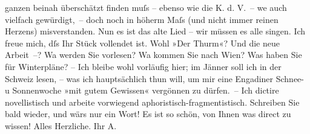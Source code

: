 \begin{ledgroupsized}[t]{13cm}
               ganzen beinah überschätzt finden muſs – ebenso wie die K. d. V. – we{\geminationn} auch vielfach
               gewürdigt, – doch noch in höherm Maſs (und nicht immer reinen Herzens) misverstanden.
               Nun es ist das alte Lied – wir müssen es alle singen. Ich freue mich, dſs Ihr Stück
               vollendet ist. Wohl »Der Thurm«? Und die neue
               Arbeit –? Wa{\geminationn} werden Sie vorlesen? Wa{\geminationn} kommen Sie nach Wien? Was haben Sie für Winterpläne? – Ich bleibe wohl vorläufig hier; im
                  Jänner{ }soll {\pb}ich in der Schweiz lesen, – was ich hauptsächlich thun
               will, um mir eine Engadiner Schnee- u
               Sonnenwoche \strikeout{\textcolor{gray}{ver}} »mit gutem Gewissen« vergönnen zu dürfen. – Ich dictire novellistisch und
               arbeite vorwiegend aphoristisch-fragmentistisch. Schreiben Sie bald wieder, und wärs
               nur ein Wort! Es ist so schön, von Ihnen was direct zu wissen! \pend
           \pstart
           Alles Herzliche. Ihr \spacefill\mbox{A.}\pend
           
         
         \endnumbering{}\end{ledgroupsized}  \newcommand{\dateiname}{L02419}\newcommand{\titel}{Arthur Schnitzler an Hugo Hofmannsthal, [5?.] 11. 1924}\newcommand{\editorInnen}{Martin Anton Müller und Gerd-Hermann Susen}
      